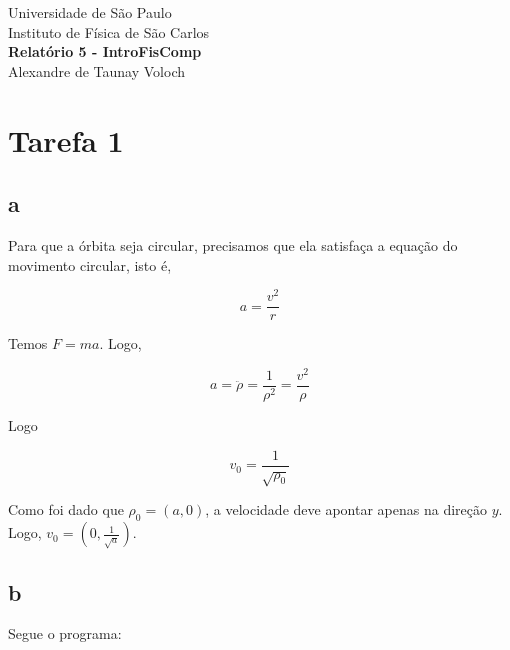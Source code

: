 \documentclass[12pt,a4paper]{article}
\begin{document}
	\begin{titlepage}
		\begin{center}
			\large Universidade de São Paulo\\[0.2cm]
			\large Instituto de Física de São Carlos\\[7cm]
			\huge \textbf{Relatório 5 - IntroFisComp}\\[6cm]
			
			\large Alexandre de Taunay Voloch \\[0.2cm]
		\end{center}
	\end{titlepage}

\section{Tarefa 1}
\subsection{a}

Para que a órbita seja circular, precisamos que ela satisfaça a equação do movimento circular, isto é,

\[ a = \frac{v^2}{r} \]

Temos $F = ma$. Logo,

\[ a = \ddot{\rho} = \frac{1}{\rho^2} = \frac{v^2}{\rho} \]

Logo

\[ v_0 = \frac{1}{\sqrt{\rho_0}} \]

Como foi dado que $\rho_0 = (a, 0)$, a velocidade deve apontar apenas na direção $y$. Logo, $v_0 = (0, \frac{1}{\sqrt{a}})$.

\subsection{b}

Segue o programa:
\end{document}
